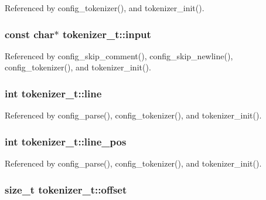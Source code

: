 Referenced by config\-\_\-tokenizer(), and tokenizer\-\_\-init().

\hypertarget{structtokenizer__t_a6bbf17dce934e63d0e8d2ab70cab3c6f}{
\subsubsection[{input}]{\setlength{\rightskip}{0pt plus 5cm}const char$\ast$ tokenizer\-\_\-t\-::input}}\label{structtokenizer__t_a6bbf17dce934e63d0e8d2ab70cab3c6f}


Referenced by config\-\_\-skip\-\_\-comment(), config\-\_\-skip\-\_\-newline(), config\-\_\-tokenizer(), and tokenizer\-\_\-init().

\hypertarget{structtokenizer__t_a67bb4f9264facd6cb0a69ff43a0c9c2c}{
\subsubsection[{line}]{\setlength{\rightskip}{0pt plus 5cm}int tokenizer\-\_\-t\-::line}}\label{structtokenizer__t_a67bb4f9264facd6cb0a69ff43a0c9c2c}


Referenced by config\-\_\-parse(), config\-\_\-tokenizer(), and tokenizer\-\_\-init().

\hypertarget{structtokenizer__t_ae6a39c5a1bc6835f04dd2d8812f7582c}{
\subsubsection[{line\-\_\-pos}]{\setlength{\rightskip}{0pt plus 5cm}int tokenizer\-\_\-t\-::line\-\_\-pos}}\label{structtokenizer__t_ae6a39c5a1bc6835f04dd2d8812f7582c}


Referenced by config\-\_\-parse(), config\-\_\-tokenizer(), and tokenizer\-\_\-init().

\hypertarget{structtokenizer__t_a837faa43c58e8ff4f72c21a08a015a51}{
\subsubsection[{offset}]{\setlength{\rightskip}{0pt plus 5cm}size\-\_\-t tokenizer\-\_\-t\-::offset}}\label{structtokenizer__t_a837faa43c58e8ff4f72c21a08a015a51}


